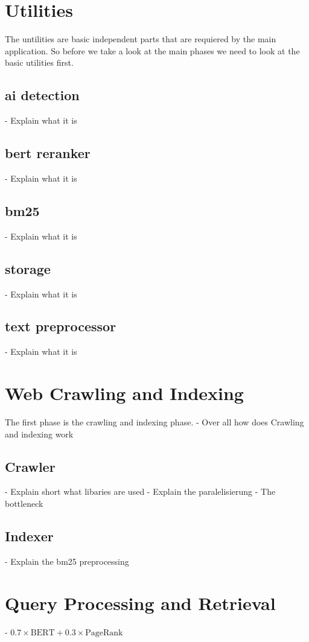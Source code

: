 \section{Utilities}
The untilities are basic independent parts that are requiered by the main application. So before we take a look at the main phases we need to look at the basic utilities first.
\subsection{ai detection}
- Explain what it is
\subsection{bert reranker}
- Explain what it is
\subsection{bm25}
- Explain what it is
\subsection{storage}
- Explain what it is
\subsection{text preprocessor}
- Explain what it is

\section{Web Crawling and Indexing}
The first phase is the crawling and indexing phase. 
- Over all how does Crawling and indexing work
\subsection{Crawler}
- Explain short what libaries are used
- Explain the paralelisierung
- The bottleneck
\subsection{Indexer}
- Explain the bm25 preprocessing

\section{Query Processing and Retrieval}
- $0.7 \times \text{BERT} + 0.3 \times \text{PageRank}$

